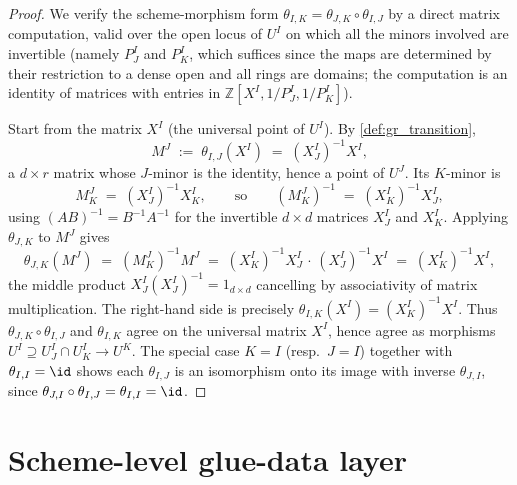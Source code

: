 \begin{proof}
  \leanok
  We verify the scheme-morphism form
  \(\theta_{I,K} = \theta_{J,K} \circ \theta_{I,J}\) by a direct matrix
  computation, valid over the open locus of \(U^I\) on which all the minors
  involved are invertible (namely \(P^I_J\) and \(P^I_K\), which suffices since
  the maps are determined by their restriction to a dense open and all rings are
  domains; the computation is an identity of matrices with entries in
  \(\mathbb{Z}[X^I, 1/P^I_J, 1/P^I_K]\)).

  Start from the matrix \(X^I\) (the universal point of \(U^I\)). By
  \cref{def:gr_transition},
  \[
    M^J \;:=\; \theta_{I,J}(X^I) \;=\; (X^I_J)^{-1} X^I,
  \]
  a \(d \times r\) matrix whose \(J\)-minor is the identity, hence a point of
  \(U^J\). Its \(K\)-minor is
  \[
    M^J_K \;=\; (X^I_J)^{-1} X^I_K,
    \qquad\text{so}\qquad
    (M^J_K)^{-1} \;=\; (X^I_K)^{-1} X^I_J,
  \]
  using \((AB)^{-1} = B^{-1} A^{-1}\) for the invertible \(d \times d\) matrices
  \(X^I_J\) and \(X^I_K\). Applying \(\theta_{J,K}\) to \(M^J\) gives
  \[
    \theta_{J,K}(M^J) \;=\; (M^J_K)^{-1} M^J
    \;=\; (X^I_K)^{-1} X^I_J \,\cdot\, (X^I_J)^{-1} X^I
    \;=\; (X^I_K)^{-1} X^I,
  \]
  the middle product \(X^I_J (X^I_J)^{-1} = 1_{d\times d}\) cancelling by
  associativity of matrix multiplication. The right-hand side is precisely
  \(\theta_{I,K}(X^I) = (X^I_K)^{-1} X^I\). Thus
  \(\theta_{J,K} \circ \theta_{I,J}\) and \(\theta_{I,K}\) agree on the
  universal matrix \(X^I\), hence agree as morphisms \(U^I \supseteq U^I_J \cap
  U^I_K \to U^K\). The special case \(K = I\) (resp.\ \(J = I\)) together with
  \(\theta_{I,I} = \id\) shows each \(\theta_{I,J}\) is an isomorphism onto its
  image with inverse \(\theta_{J,I}\), since
  \(\theta_{J,I} \circ \theta_{I,J} = \theta_{I,I} = \id\).
\end{proof}

\section{Scheme-level glue-data layer}
\label{sec:gr_glue_layer}

